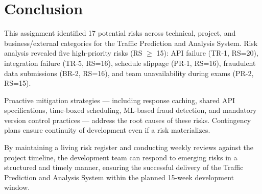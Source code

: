 \documentclass[12pt,a4paper]{article}
\begin{document}
\section{Conclusion}
This assignment identified 17 potential risks across technical, project, and business/external categories for the Traffic Prediction and Analysis System. Risk analysis revealed five high-priority risks (RS $\geq$ 15): API failure (TR-1, RS=20), integration failure (TR-5, RS=16), schedule slippage (PR-1, RS=16), fraudulent data submissions (BR-2, RS=16), and team unavailability during exams (PR-2, RS=15).

Proactive mitigation strategies --- including response caching, shared API specifications, time-boxed scheduling, ML-based fraud detection, and mandatory version control practices --- address the root causes of these risks. Contingency plans ensure continuity of development even if a risk materializes.

By maintaining a living risk register and conducting weekly reviews against the project timeline, the development team can respond to emerging risks in a structured and timely manner, ensuring the successful delivery of the Traffic Prediction and Analysis System within the planned 15-week development window.
\end{document}

